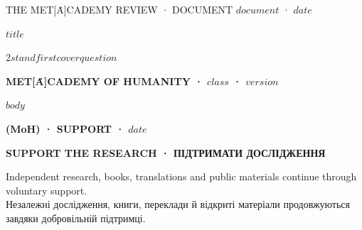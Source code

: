 \documentclass[10pt,a4paper]{article}
\begin{document}
\justifying
\thispagestyle{empty}
{\fontsize{8}{10}\selectfont\ttfamily\color{MoHMuted}THE MET[Ȧ]CADEMY REVIEW · DOCUMENT $document$ · $date$\par}\vspace{3mm}{\color{MoHLine}\rule{\linewidth}{0.7pt}}\vspace{7mm}
{\fontsize{28}{31}\selectfont\bfseries\color{MoHInk}$title$\par}\vspace{8mm}
\begin{multicols}{2}\small\textbf{$standfirst$}\columnbreak\color{MoHMuted}$coverquestion$\end{multicols}
\vspace{5mm}{\color{MoHBlue}\rule{\linewidth}{1.1pt}}\vfill
{\fontsize{8}{10}\selectfont\bfseries\color{MoHMuted}MET[Ȧ]CADEMY OF HUMANITY · $class$ · $version$\par}\newpage
$body$
\clearpage\thispagestyle{fancy}
{\fontsize{8}{10}\selectfont\bfseries\color{MoHMuted}(MoH) · SUPPORT · $date$\par}\vspace{5mm}
{\fontsize{25}{28}\selectfont\bfseries\color{MoHInk}SUPPORT THE RESEARCH · ПІДТРИМАТИ ДОСЛІДЖЕННЯ\par}\vspace{4mm}
{\fontsize{11}{15}\selectfont\color{MoHMuted}Independent research, books, translations and public materials continue through voluntary support.\\Незалежні дослідження, книги, переклади й відкриті матеріали продовжуються завдяки добровільній підтримці.\par}\vspace{9mm}
\noindent\begin{minipage}[t]{0.30\linewidth}\par\vspace{4mm}\color{black}\par{}\end{minipage}\hfill
\end{document}
